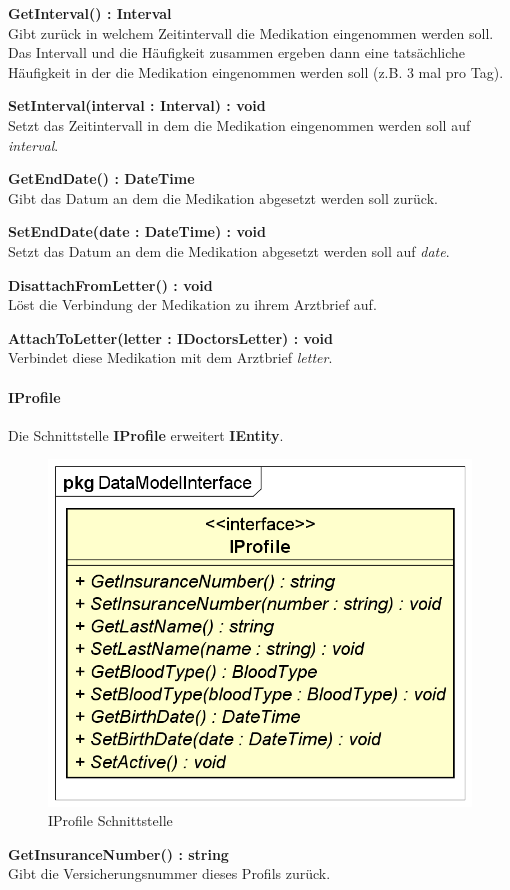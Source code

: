 \documentclass[a4paper]{scrreprt}
\begin{document}
\textbf{GetInterval() : Interval}\\
Gibt zurück in welchem Zeitintervall die Medikation eingenommen werden soll. Das Intervall und die Häufigkeit zusammen ergeben dann eine tatsächliche Häufigkeit in der die Medikation eingenommen werden soll (z.B. 3 mal pro Tag).

\textbf{SetInterval(interval : Interval) : void}\\
Setzt das Zeitintervall in dem die Medikation eingenommen werden soll auf \textit{interval}.

\textbf{GetEndDate() : DateTime}\\
Gibt das Datum an dem die Medikation abgesetzt werden soll zurück.

\textbf{SetEndDate(date : DateTime) : void}\\
Setzt das Datum an dem die Medikation abgesetzt werden soll auf \textit{date}.

\textbf{DisattachFromLetter() : void}\\
Löst die Verbindung der Medikation zu ihrem Arztbrief auf.

\textbf{AttachToLetter(letter : IDoctorsLetter) : void}\\
Verbindet diese Medikation mit dem Arztbrief \textit{letter}.


\paragraph{IProfile}
Die Schnittstelle \textbf{IProfile} erweitert \textbf{IEntity}.

\begin{figure}[H]
\centering
\includegraphics[width=0.55\textheight]{graphics/Klassendiagramme/Model/IProfile.png}
\caption{IProfile Schnittstelle}
\end{figure}
\textbf{GetInsuranceNumber() : string}\\
Gibt die Versicherungsnummer dieses Profils zurück.
\end{document}
